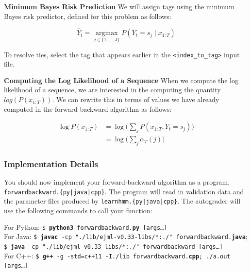 \documentclass[11pt,addpoints,answers]{exam}
\newcommand \argmax {\operatorname*{argmax}}
\begin{document}
\vspace{0.4 in}
\textbf{Minimum Bayes Risk Prediction}
We will assign tags using the minimum Bayes risk predictor, defined for this problem as follows:

$$\hat{Y}_t = \argmax_{j\in \{1,\dots,J\}} P(Y_t = s_j \mid x_{1:T})$$

To resolve ties, select the tag that appears earlier in the \texttt{<index\_to\_tag>} input file.

\clearpage

\textbf{Computing the Log Likelihood of a Sequence}
When we compute the log likelihood of a sequence, we are interested in the computing the quantity $log(P(x_{1:T}))$. We can rewrite this in terms of values we have already computed in the forward-backward algorithm as follows:

\begin{align*}
    \log{P(x_{1:T})} &= \log{\big(\sum_j P(x_{1:T},Y_t=s_j)\big)}\\
    &= \log{\big(\sum_j \alpha_T(j)\big)}
\end{align*}

\subsubsection{Implementation Details}

You should now implement your forward-backward algorithm as a program, \\ \texttt{forwardbackward.\{py|java|cpp\}}. The program will read in validation data and the parameter files produced by \texttt{learnhmm.\{py|java|cpp\}}. The autograder will use the following commands to call your function:


\begin{tabbing}
For Python: \=\texttt{\$ \textbf{python3} forwardbackward.\textbf{py} [args\dots]}\\
For Java: \>\texttt{\$ \textbf{javac} -cp "./lib/ejml-v0.33-libs/*:./" forwardbackward.\textbf{java}};\\ 
\>  \texttt{\$ \textbf{java} -cp "./lib/ejml-v0.33-libs/*:./" forwardbackward [args\dots]}\\
For C++: \>\texttt{\$ \textbf{g++} -g -std=c++11 -I./lib forwardbackward.\textbf{cpp}; ./a.out [args\dots]}\\
\end{tabbing}
\end{document}
